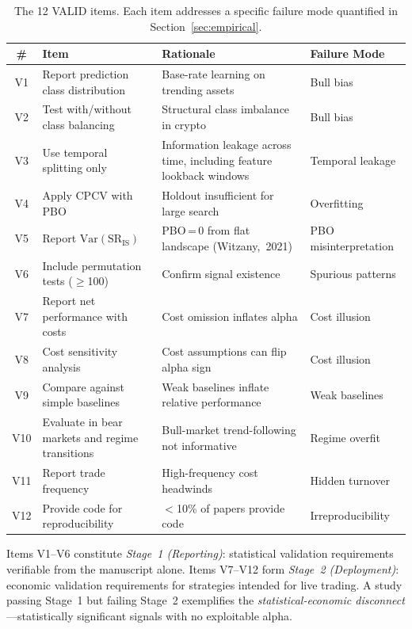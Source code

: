 \documentclass[sigconf,anonymous,review]{acmart}
\begin{document}
\begin{table}[t]
\centering
\caption{The 12 VALID items. Each item addresses a specific failure mode quantified in Section~\ref{sec:empirical}.}
\label{tab:valid}
\footnotesize
\setlength{\tabcolsep}{4pt}
\begin{tabular}{@{}c>{\raggedright\arraybackslash}p{3.4cm}>{\raggedright\arraybackslash}p{5.9cm}>{\raggedright\arraybackslash}p{2.4cm}@{}}
\toprule
\# & Item & Rationale & Failure Mode \\
\midrule
V1 & Report prediction class distribution & Base-rate learning on trending assets & Bull bias \\
V2 & Test with/without class balancing & Structural class imbalance in crypto & Bull bias \\
V3 & Use temporal splitting only & Information leakage across time, including feature lookback windows & Temporal leakage \\
V4 & Apply CPCV with PBO & Holdout insufficient for large search & Overfitting \\
V5 & Report $\mathrm{Var}(\mathrm{SR}_{\mathrm{IS}})$ & PBO\,=\,0 from flat landscape \mbox{(Witzany, 2021)} & PBO misinterpretation \\
V6 & Include permutation tests ($\geq$100) & Confirm signal existence & Spurious patterns \\
V7 & Report net performance with costs & Cost omission inflates alpha & Cost illusion \\
V8 & Cost sensitivity analysis & Cost assumptions can flip alpha sign & Cost illusion \\
V9 & Compare against simple baselines & Weak baselines inflate relative performance & Weak baselines \\
V10 & Evaluate in bear markets and regime transitions & Bull-market trend-following not informative & Regime overfit \\
V11 & Report trade frequency & High-frequency cost headwinds & Hidden turnover \\
V12 & Provide code for reproducibility & $<$10\% of papers provide code & Irrepro\-ducibility \\
\bottomrule
\end{tabular}
\end{table}

Items V1--V6 constitute \emph{Stage~1 (Reporting)}: statistical
validation requirements verifiable from the manuscript alone.
Items V7--V12 form \emph{Stage~2 (Deployment)}: economic validation
requirements for strategies intended for live trading.
A study passing Stage~1 but failing Stage~2 exemplifies the
\emph{statistical-economic disconnect}---statistically significant
signals with no exploitable alpha.
\end{document}
